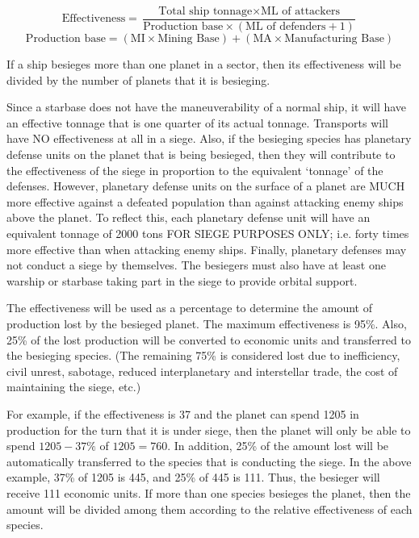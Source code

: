 \documentclass[10pt,titlepage]{article}
\begin{document}
\[
	\textrm{Effectiveness}  =  \dfrac{\textrm{Total ship tonnage}  \times  \textrm{ML of attackers}}{\textrm{Production base}  \times  (\textrm{ML of defenders} + 1)}
\]
\[
	\textrm{Production base}  =  (\textrm{MI} \times \textrm{Mining Base})  +  (\textrm{MA} \times \textrm{Manufacturing Base})
\]

If a ship besieges more than one planet in a sector, then its effectiveness
will be divided by the number of planets that it is besieging.

Since a starbase does not have the maneuverability of a normal ship, it
will have an effective tonnage that is one quarter of its actual tonnage.
Transports will have NO effectiveness at all in a siege.  Also, if the
besieging species has planetary defense units on the planet that is being
besieged, then they will contribute to the effectiveness of the siege in
proportion to the equivalent `tonnage' of the defenses.  However, planetary
defense units on the surface of a planet are MUCH more effective against a
defeated population than against attacking enemy ships above the planet.  To
reflect this, each planetary defense unit will have an equivalent tonnage of
2000 tons FOR SIEGE PURPOSES ONLY; i.e. forty times more effective than when
attacking enemy ships.  Finally, planetary defenses may not conduct a siege
by themselves.  The besiegers must also have at least one warship or starbase
taking part in the siege to provide orbital support.

The effectiveness will be used as a percentage to determine the amount of
production lost by the besieged planet.  The maximum effectiveness is 95\%.
Also, 25\% of the lost production will be converted to economic units and
transferred to the besieging species.  (The remaining 75\% is considered lost
due to inefficiency, civil unrest, sabotage, reduced interplanetary and
interstellar trade, the cost of maintaining the siege, etc.)

For example, if the effectiveness is 37 and the planet can spend 1205 in
production for the turn that it is under siege, then the planet will only be
able to spend $1205 - 37\%$ of $1205 = 760$.  In addition, 25\% of the amount lost
will be automatically transferred to the species that is conducting the siege.
In the above example, 37\% of 1205 is 445, and 25\% of 445 is 111.  Thus, the
besieger will receive 111 economic units.  If more than one species besieges
the planet, then the amount will be divided among them according to the
relative effectiveness of each species.
\end{document}
